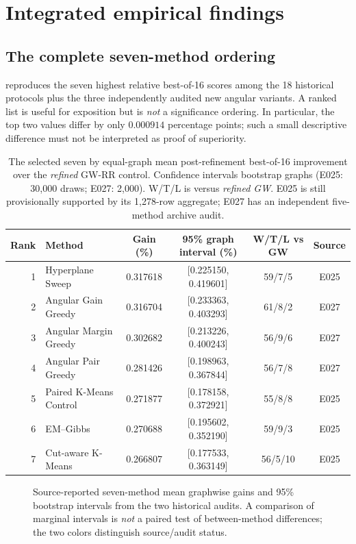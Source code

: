 \section{Integrated empirical findings}\label{sec:results}
\subsection{The complete seven-method ordering}
 reproduces the seven highest relative best-of-16 scores among the 18 historical protocols plus the three independently audited new angular variants. A ranked list is useful for exposition but is \emph{not} a significance ordering. In particular, the top two values differ by only $0.000914$ percentage points; such a small descriptive difference must not be interpreted as proof of superiority.
\begin{table}[tb]
\centering\small
\caption{The selected seven by equal-graph mean post-refinement best-of-16 improvement over the \emph{refined} GW-RR control. Confidence intervals bootstrap graphs (E025: 30,000 draws; E027: 2,000). W/T/L is versus \emph{refined GW}. E025 is still provisionally supported by its 1,278-row aggregate; E027 has an independent five-method archive audit.}\label{tab:seven}
\begin{tabular}{@{}rlcccc@{}}
\toprule
Rank & Method & Gain (\%) & 95\% graph interval (\%) & W/T/L vs GW & Source\\
\midrule
1 & Hyperplane Sweep      & 0.317618 & [0.225150, 0.419601] & 59/7/5 & E025\\
2 & Angular Gain Greedy   & 0.316704 & [0.233363, 0.403293] & 61/8/2 & E027\\
3 & Angular Margin Greedy & 0.302682 & [0.213226, 0.400243] & 56/9/6 & E027\\
4 & Angular Pair Greedy   & 0.281426 & [0.198963, 0.367844] & 56/7/8 & E027\\
5 & Paired K-Means Control& 0.271877 & [0.178158, 0.372921] & 55/8/8 & E025\\
6 & EM--Gibbs             & 0.270688 & [0.195602, 0.352190] & 59/9/3 & E025\\
7 & Cut-aware K-Means     & 0.266807 & [0.177533, 0.363149] & 56/5/10 & E025\\
\bottomrule
\end{tabular}
\end{table}

\begin{figure}[tb]
\centering

\caption{Source-reported seven-method mean graphwise gains and 95\% bootstrap intervals from the two historical audits. A comparison of marginal intervals is \emph{not} a paired test of between-method differences; the two colors distinguish source/audit status.}
\label{fig:ranking}
\end{figure}

